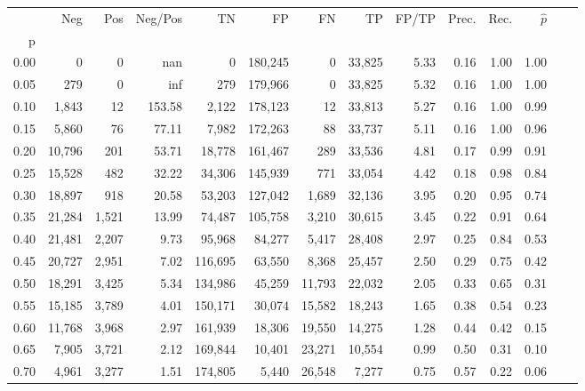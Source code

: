 \begin{tabular}{rrrrrrrrrrrrrr}
\toprule
{} &     Neg &    Pos & Neg/Pos &       TN &       FP &      FN &      TP & FP/TP & Prec. &  Rec. & $\hat{p}$ \\
p    &         &        &         &          &          &         &         &       &       &       &           \\
\midrule
0.00 &       0 &      0 &     nan &        0 &  180,245 &       0 &  33,825 &  5.33 &  0.16 &  1.00 &      1.00 \\
0.05 &     279 &      0 &     inf &      279 &  179,966 &       0 &  33,825 &  5.32 &  0.16 &  1.00 &      1.00 \\
0.10 &   1,843 &     12 &  153.58 &    2,122 &  178,123 &      12 &  33,813 &  5.27 &  0.16 &  1.00 &      0.99 \\
0.15 &   5,860 &     76 &   77.11 &    7,982 &  172,263 &      88 &  33,737 &  5.11 &  0.16 &  1.00 &      0.96 \\
0.20 &  10,796 &    201 &   53.71 &   18,778 &  161,467 &     289 &  33,536 &  4.81 &  0.17 &  0.99 &      0.91 \\
0.25 &  15,528 &    482 &   32.22 &   34,306 &  145,939 &     771 &  33,054 &  4.42 &  0.18 &  0.98 &      0.84 \\
0.30 &  18,897 &    918 &   20.58 &   53,203 &  127,042 &   1,689 &  32,136 &  3.95 &  0.20 &  0.95 &      0.74 \\
0.35 &  21,284 &  1,521 &   13.99 &   74,487 &  105,758 &   3,210 &  30,615 &  3.45 &  0.22 &  0.91 &      0.64 \\
0.40 &  21,481 &  2,207 &    9.73 &   95,968 &   84,277 &   5,417 &  28,408 &  2.97 &  0.25 &  0.84 &      0.53 \\
0.45 &  20,727 &  2,951 &    7.02 &  116,695 &   63,550 &   8,368 &  25,457 &  2.50 &  0.29 &  0.75 &      0.42 \\
0.50 &  18,291 &  3,425 &    5.34 &  134,986 &   45,259 &  11,793 &  22,032 &  2.05 &  0.33 &  0.65 &      0.31 \\
0.55 &  15,185 &  3,789 &    4.01 &  150,171 &   30,074 &  15,582 &  18,243 &  1.65 &  0.38 &  0.54 &      0.23 \\
0.60 &  11,768 &  3,968 &    2.97 &  161,939 &   18,306 &  19,550 &  14,275 &  1.28 &  0.44 &  0.42 &      0.15 \\
0.65 &   7,905 &  3,721 &    2.12 &  169,844 &   10,401 &  23,271 &  10,554 &  0.99 &  0.50 &  0.31 &      0.10 \\
0.70 &   4,961 &  3,277 &    1.51 &  174,805 &    5,440 &  26,548 &   7,277 &  0.75 &  0.57 &  0.22 &      0.06 \\

\end{tabular}
